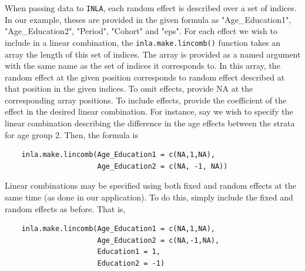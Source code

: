 When passing data to \texttt{INLA}, each random effect is described over a set of indices. In our example, theses are provided in the given formula as "Age\_Education1", "Age\_Education2", "Period", "Cohort" and "eps". For each effect we wish to include in a linear combination, the \texttt{inla.make.lincomb()} function takes an array the length of this set of indices. The array is provided as a named argument with the same name as the set of indices it corresponds to. In this array, the random effect at the given position corresponds to random effect described at that position in the given indices. To omit effects, provide NA at the corresponding array positions. To include effects, provide the coefficient of the effect in the desired linear combination. For instance, say we wish to specify the linear combination describing the difference in the age effects between the strata for age group 2. Then, the formula is
\begin{lstlisting}
    inla.make.lincomb(Age_Education1 = c(NA,1,NA), 
                      Age_Education2 = c(NA, -1, NA))
\end{lstlisting}

Linear combinations may be specified using both fixed and random effects at the same time (as done in our application). To do this, simply include the fixed and random effects as before. That is, 
\begin{lstlisting}
    inla.make.lincomb(Age_Education1 = c(NA,1,NA),
                      Age_Education2 = c(NA,-1,NA),
                      Education1 = 1,
                      Education2 = -1)
\end{lstlisting}


